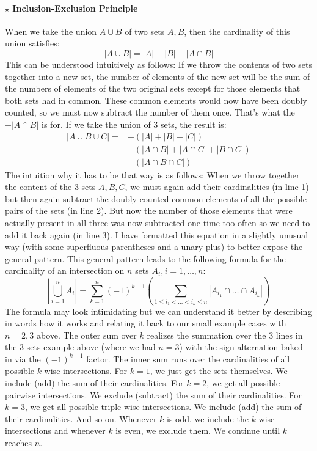 \paragraph{$\star$ Inclusion-Exclusion Principle}
When we take the union $A \cup B$ of two sets $A,B$, then the cardinality of this union satisfies:
\begin{equation}
|A \cup B| = |A| + |B| - |A \cap B|
\end{equation}
This can be understood intuitively as follows: If we throw the contents of two sets together into a new set, the number of elements of the new set will be the sum of the numbers of elements of the two original sets except for those elements that both sets had in common. These common elements would now have been doubly counted, so we must now subtract the number of them once. That's what the $- |A \cap B|$ is for. If we take the union of 3 sets, the result is: 
\begin{equation}
\begin{split}
 |A \cup B \cup C| = 
 & + (|A| + |B| + |C|)  \\
 & - (|A \cap B| + |A \cap C| + |B \cap C|)  \\
 & + (|A \cap B \cap C|)
\end{split}
\end{equation}
The intuition why it has to be that way is as follows: When we throw together the content of the 3 sets $A,B,C$, we must again add their cardinalities (in line 1) but then again subtract the doubly counted common elements of all the possible pairs of the sets (in line 2). But now the number of those elements that were actually present in all three was now subtracted one time too often so we need to add it back again (in line 3). I have formatted this equation in a slightly unusual way (with some superfluous parentheses and a unary plus) to better expose the general pattern. This general pattern leads to the following formula for the cardinality of an intersection on $n$ sets $A_i, i = 1,\ldots,n$:
\begin{equation}
\label{Eq:InclusionExclusion}
\left| \bigcup_{i=1}^{n} A_i \right| = 
\sum_{k=1}^{n} (-1)^{k-1} 
 \left( \sum_{1 \le i_1 < \dots < i_k \le n} | A_{i_1} \cap \dots \cap A_{i_k} | \right)
\end{equation}
The formula may look intimidating but we can understand it better by describing in words how it works and relating it back to our small example cases with $n=2,3$ above. The outer sum over $k$ realizes the summation over the 3 lines in the 3 sets example above (where we had $n=3$) with the sign alternation baked in via the $(-1)^{k-1}$ factor. The inner sum runs over the cardinalities of all possible $k$-wise intersections. For $k=1$, we just get the sets themselves. We include (add) the sum of their cardinalities. For $k=2$, we get all possible pairwise intersections. We exclude (subtract) the sum of their cardinalities. For $k=3$, we get all possible triple-wise intersections. We include (add) the sum of their cardinalities. And so on. Whenever $k$ is odd, we include the $k$-wise intersections and whenever $k$ is even, we exclude them. We continue until $k$ reaches $n$.

